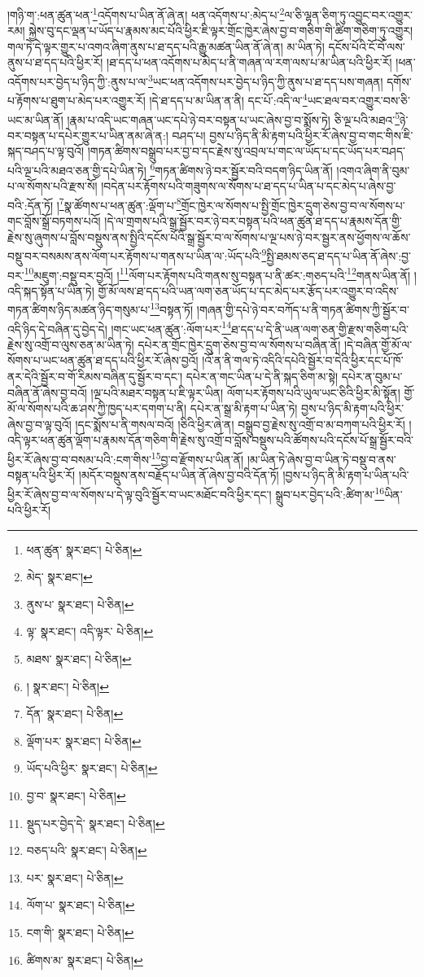 །གཉི་ག་:ཕན་ཚུན་ཕན་\footnote{ཕན་ཚུན་  སྣར་ཐང་།  པེ་ཅིན། }འདོགས་པ་ཡིན་ནོ་ཞེ་ན། ཕན་འདོགས་པ་:མེད་པ་\footnote{མེད་  སྣར་ཐང་། }ལ་ཅི་ལྷན་ཅིག་ཏུ་འབྱུང་བར་འགྱུར་རམ། སྐྱེས་བུ་དང་ལྡན་པ་ཡོད་པ་རྣམས་མང་པོའི་ཕྱིར་ཇི་ལྟར་གྲོང་ཁྱེར་ཞེས་བྱ་བ་གཅིག་གི་ཚིག་གཅིག་ཏུ་འགྱུར། གལ་ཏེ་དེ་ལྟར་གྱུར་པ་འགའ་ཞིག་ནུས་པ་ཐ་དད་པའི་རྒྱུ་མཚན་ཡིན་ནོ་ཞེ་ན། མ་ཡིན་ཏེ། དངོས་པོའི་ངོ་བོ་ལས་ནུས་པ་ཐ་དད་པའི་ཕྱིར་རོ། །ཐ་དད་པ་ཕན་འདོགས་པ་མེད་པ་ནི་གཞན་ལ་རག་ལས་པ་མ་ཡིན་པའི་ཕྱིར་རོ། །ཕན་འདོགས་པར་བྱེད་པ་ཉིད་ཀྱི་:ནུས་པ་ལ་\footnote{ནུས་པ་  སྣར་ཐང་།  པེ་ཅིན། }ཡང་ཕན་འདོགས་པར་བྱེད་པ་ཉིད་ཀྱི་ནུས་པ་ཐ་དད་པས་གཞན། དགོས་པ་རྟོགས་པ་ཐུག་པ་མེད་པར་འགྱུར་རོ། །དེ་ཐ་དད་པ་མ་ཡིན་ན་ནི། དང་པོ་:འདི་ལ་\footnote{ལྟ་  སྣར་ཐང་། འདི་ལྟར་  པེ་ཅིན། }ཡང་ཐལ་བར་འགྱུར་བས་ཅི་ཡང་མ་ཡིན་ནོ། །རྣམ་པ་འདི་ཡང་གཞན་ཡང་དཔེ་ཉེ་བར་བསྟན་པ་ཡང་ཞེས་བྱ་བ་སྨོས་ཏེ། ཅི་ལྔ་པའི་མཐའ་\footnote{མཐས་  སྣར་ཐང་།  པེ་ཅིན། }ཉེ་བར་བསྟན་པ་དཔེར་གྱུར་པ་ཡིན་ནམ་ཞེ་ན:། བཤད་པ། བྱས་པ་ཉིད་ནི་མི་རྟག་པའི་ཕྱིར་རོ་ཞེས་བྱ་བ་གང་གིས་ཇི་སྐད་བཤད་པ་ལྟ་བུའོ། །གཏན་ཚིགས་བསྒྲུབ་པར་བྱ་བ་དང་རྗེས་སུ་འབྲལ་པ་གང་ལ་ཡོད་པ་དང་ཡོད་པར་བཤད་པའི་ལྔ་པའི་མཐའ་ཅན་གྱི་དཔེ་ཡིན་ཏེ། \footnote{།    སྣར་ཐང་།  པེ་ཅིན། }གཏན་ཚིགས་ཉེ་བར་སྦྱོར་བའི་བདག་ཉིད་ཡིན་ནོ། །འགའ་ཞིག་ནི་བུམ་པ་ལ་སོགས་པའི་རྫས་སོ། །བདེན་པར་རྟོགས་པའི་གཟུགས་ལ་སོགས་པ་ཐ་དད་པ་ཡིན་པ་དང་མེད་པ་ཞེས་བྱ་བའི་:དོན་ཏོ། །\footnote{དོན་  སྣར་ཐང་།  པེ་ཅིན། }སྣ་ཚོགས་པ་ཕན་ཚུན་:ལྡོག་པ་\footnote{ལྡོག་པར་  སྣར་ཐང་།  པེ་ཅིན། }གྲོང་ཁྱེར་ལ་སོགས་པ་སྤྱི་གྲོང་ཁྱེར་དྲུག་ཅེས་བྱ་བ་ལ་སོགས་པ་གང་བློས་སྒྲོ་བཏགས་པའོ། །དེ་ལ་གྲགས་པའི་སྒྲ་སྦྱོར་བར་ཉེ་བར་བསྟན་པའི་ཕན་ཚུན་ཐ་དད་པ་རྣམས་དོན་གྱི་རྗེས་སུ་ཞུགས་པ་བློས་བསྡུས་ནས་སྤྱིའི་དངོས་པོའི་སྒྲ་སྦྱོར་བ་ལ་སོགས་པ་ལྔ་པས་ཉེ་བར་སྦྱར་ནས་ཕྱོགས་ལ་ཆོས་བསྡུ་བར་བསམས་ནས་ལོག་པར་རྟོགས་པ་གནས་པ་ཡིན་ལ་:ཡོད་པའི་\footnote{ཡོད་པའི་ཕྱིར་  སྣར་ཐང་།  པེ་ཅིན། }སྤྱི་ཐམས་ཅད་ཐ་དད་པ་ཡིན་ནོ་ཞེས་:བྱ་བར་\footnote{བྱ་བ་  སྣར་ཐང་།  པེ་ཅིན། }མཇུག་:བསྡུ་བར་བྱའོ། །\footnote{སྡུད་པར་བྱེད་དེ་  སྣར་ཐང་།  པེ་ཅིན། }ལོག་པར་རྟོགས་པའི་གནས་སུ་བསྟན་པ་ནི་ཚར་:གཅད་པའི་\footnote{བཅད་པའི་  སྣར་ཐང་།  པེ་ཅིན། }གནས་ཡིན་ནོ། །འདི་སྐད་སྟོན་པ་ཡིན་ཏེ། གྱོ་མོ་ལས་ཐ་དད་པའི་ཡན་ལག་ཅན་ཡོད་པ་དང་མེད་པར་རྩོད་པར་འགྱུར་བ་འདིས་གཏན་ཚིགས་ཉིད་མཚན་ཉིད་གསུམ་པ་\footnote{པར་  སྣར་ཐང་།  པེ་ཅིན། }བསྟན་ཏོ། །གཞན་གྱི་དཔེ་ཉེ་བར་བཀོད་པ་ནི་གཏན་ཚིགས་ཀྱི་སྦྱོར་བ་འདི་ཉིད་དེ་བཞིན་དུ་བྱེད་དེ། །གང་ཡང་ཕན་ཚུན་:ལོག་པར་\footnote{ལོག་པ་  སྣར་ཐང་།  པེ་ཅིན། }ཐ་དད་པ་དེ་ནི་ཡན་ལག་ཅན་གྱི་རྫས་གཅིག་པའི་རྗེས་སུ་འགྲོ་བ་ལུས་ཅན་མ་ཡིན་ཏེ། དཔེར་ན་གྲོང་ཁྱེར་དྲུག་ཅེས་བྱ་བ་ལ་སོགས་པ་བཞིན་ནོ། །དེ་བཞིན་གྱོ་མོ་ལ་སོགས་པ་ཡང་ཕན་ཚུན་ཐ་དད་པའི་ཕྱིར་རོ་ཞེས་བྱའོ། །འོ་ན་ནི་གལ་ཏེ་འདིའི་དཔེའི་སྦྱོར་བ་དེའི་ཕྱིར་དང་པོ་ཁོ་ནར་དེའི་སྦྱོར་བ་གོ་རིམས་བཞིན་དུ་སྦྱོར་བ་དང་། དཔེར་ན་གང་ཡིན་པ་དེ་ནི་སྐད་ཅིག་མ་སྟེ། དཔེར་ན་བུམ་པ་བཞིན་ནོ་ཞེས་བྱ་བའོ། །ལྔ་པའི་མཐར་བསྟན་པ་ཇི་ལྟར་ཡིན། ལོག་པར་རྟོགས་པའི་ཡུལ་ཡང་ཅིའི་ཕྱིར་མི་སྟོན། གྱོ་མོ་ལ་སོགས་པའི་ཆ་ཤས་ཀྱི་ཁྱད་པར་དགག་པ་ནི། དཔེར་ན་སྒྲ་མི་རྟག་པ་ཡིན་ཏེ། བྱས་པ་ཉིད་མི་རྟག་པའི་ཕྱིར་ཞེས་བྱ་བ་ལྟ་བུའོ། །དང་སྨོས་པ་ནི་གསལ་བའོ། །ཅིའི་ཕྱིར་ཞེ་ན། བསྒྲུབ་བྱ་རྗེས་སུ་འགྲོ་བ་མ་བཀག་པའི་ཕྱིར་རོ། །འདི་ལྟར་ཕན་ཚུན་ལྡོག་པ་རྣམས་དོན་གཅིག་གི་རྗེས་སུ་འགྲོ་བ་བློས་བསྡུས་པའི་ཚོགས་པའི་དངོས་པོ་སྒྲ་སྦྱོར་བའི་ཕྱིར་རོ་ཞེས་བྱ་བ་བསམ་པའི་:ངག་གིས་\footnote{ངག་གི་  སྣར་ཐང་།  པེ་ཅིན། }བྱ་བ་རྫོགས་པ་ཡིན་ནོ། །མ་ཡིན་ཏེ་ཞེས་བྱ་བ་ཡིན་ཏེ་བསྡུ་བ་ནས་བསྟན་པའི་ཕྱིར་རོ། །མདོར་བསྡུས་ནས་བརྗོད་པ་ཡིན་ནོ་ཞེས་བྱ་བའི་དོན་ཏོ། །བྱས་པ་ཉིད་ནི་མི་རྟག་པ་ཡིན་པའི་ཕྱིར་རོ་ཞེས་བྱ་བ་ལ་སོགས་པ་དེ་ལྟ་བུའི་སྦྱོར་བ་ཡང་མཐོང་བའི་ཕྱིར་དང་། སྒྲུབ་པར་བྱེད་པའི་:ཚིག་མ་\footnote{ཚིགས་མ་  སྣར་ཐང་།  པེ་ཅིན། }ཡིན་པའི་ཕྱིར་རོ། 